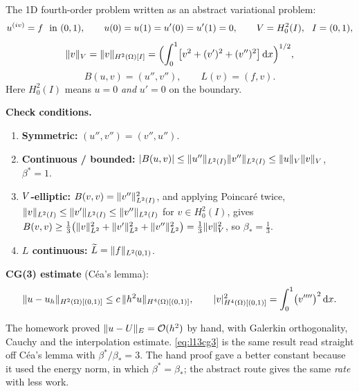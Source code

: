 The 1D fourth-order problem written as an abstract variational problem:
\begin{equation}\label{eq:l13beamabs}
  u^{(iv)}=f \ \text{ in } (0,1),\qquad u(0)=u(1)=u'(0)=u'(1)=0,
  \qquad V=H^{2}_{0}(I),\ \ I=(0,1),
\end{equation}
\begin{equation}\label{eq:l13beamnorm}
  \lVert v\rVert_{V}=\lVert v\rVert_{H^{2}(\Omega)[I]}
   =\Bigl(\int_{0}^{1}\bigl[v^{2}+(v')^{2}+(v'')^{2}\bigr]\,\mathrm{d} x\Bigr)^{1/2},
\end{equation}
\begin{equation}\label{eq:l13beamBL}
  B(u,v)=(u'',v''),\qquad L(v)=(f,v).
\end{equation}
Here $H^{2}_{0}(I)$ means $u=0$ \emph{and} $u'=0$ on the boundary.

\noindent
\textbf{Check conditions.}
\begin{enumerate}[label=\arabic*),leftmargin=2.2em,itemsep=3pt]
\item \textbf{Symmetric:} $(u'',v'')=(v'',u'')$. \cmark
\item \textbf{Continuous / bounded:}
  $|B(u,v)|\le\lVert u''\rVert_{L^{2}(I)}\lVert v''\rVert_{L^{2}(I)}
   \le\lVert u\rVert_{V}\lVert v\rVert_{V}$, $\beta^{*}=1$. \cmark
\item \textbf{$V$-elliptic:} $B(v,v)=\lVert v''\rVert^{2}_{L^{2}(I)}$, and
  applying Poincar\'e twice,
  $\lVert v\rVert_{L^{2}(I)}\le\lVert v'\rVert_{L^{2}(I)}\le\lVert v''\rVert_{L^{2}(I)}$
  for $v\in H^{2}_{0}(I)$, gives
  $B(v,v)\ge\tfrac13\bigl(\lVert v\rVert^{2}_{L^{2}}+\lVert v'\rVert^{2}_{L^{2}}
   +\lVert v''\rVert^{2}_{L^{2}}\bigr)=\tfrac13\lVert v\rVert^{2}_{V}$,
  so $\beta_{*}=\tfrac13$. \cmark
\item \textbf{$L$ continuous:} $\widetilde{L}=\lVert f\rVert_{L^{2}(0,1)}$. \cmark
\end{enumerate}

\noindent
\textbf{CG(3) estimate} (C\'ea's lemma):
\begin{equation}\label{eq:l13cg3}
  \lVert u-u_{h}\rVert_{H^{2}(\Omega)[(0,1)]}\le c\,\lVert h^{2}u\rVert_{H^{4}(\Omega)[(0,1)]},
  \qquad
  |v|^{2}_{H^{4}(\Omega)[(0,1)]}=\int_{0}^{1}\bigl(v''''\bigr)^{2}\,\mathrm{d} x .
\end{equation}

\begin{recall}
The homework proved $\lVert u-U\rVert_{E}=\mathcal{O}(h^{2})$ by hand, with Galerkin
orthogonality, Cauchy and the interpolation estimate. \eqref{eq:l13cg3} is the
same result read straight off C\'ea's lemma with
$\beta^{*}/\beta_{*}=3$. The hand proof gave a better constant because it used
the energy norm, in which $\beta^{*}=\beta_{*}$; the abstract route gives the
same \emph{rate} with less work.
\end{recall}

